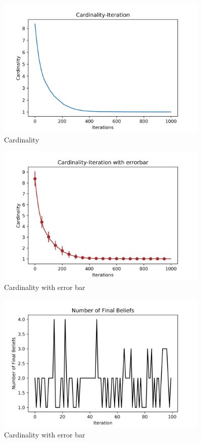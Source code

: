 \documentclass[a4paper,12pt]{article}
\begin{document}
    \begin{figure}[H]
    	\centering
    	\includegraphics[width=0.9\textwidth]{Card50_4_1000_100_e3}
    	\caption{Cardinality}\label{Card50_4_1000_100_e3_h}
    \end{figure}
    \begin{figure}[H]
    	\centering
    	\includegraphics[width=0.9\textwidth]{CardErr50_4_1000_100_e3}
    	\caption{Cardinality with error bar}\label{CardErr50_4_1000_1500_e3_h}
    \end{figure}
        \begin{figure}[H]
    	\centering
    	\includegraphics[width=0.9\textwidth]{numbef50_4_1000_100_e3}
    	\caption{Cardinality with error bar}\label{numbef50_4_1000_1500_e3_h}
    \end{figure}
\end{document}
